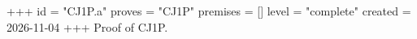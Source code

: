 +++
id = "CJ1P.a"
proves = "CJ1P"
premises = []
level = "complete"
created = 2026-11-04
+++
Proof of CJ1P.
